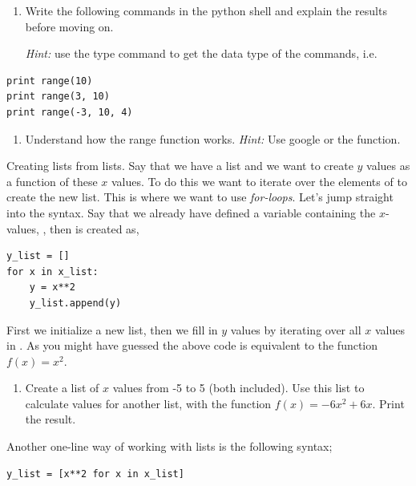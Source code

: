 \documentclass{article}
\begin{document}
\begin{enumerate}[resume]
  \item Write the following commands in the python shell and explain the results
    before moving on.

    {\em Hint:} use the type command to get the data type of the commands,
    i.e. 
\end{enumerate}


\begin{lstlisting}
print range(10)
print range(3, 10)
print range(-3, 10, 4)
\end{lstlisting}

\begin{enumerate}[resume]
    \item Understand how the range function works.
        {\em Hint:} Use google or the  function.
\end{enumerate}

Creating lists from lists.
Say that we have a list  and we want to create $y$ values as a function of these $x$ values.
To do this we want to iterate over the elements of  to create the new list.
This is where we want to use {\em for-loops}.
Let's jump straight into the syntax.
Say that we already have defined a variable containing the $x$-values, , then  is created as,

\begin{lstlisting}
y_list = []
for x in x_list:
    y = x**2
    y_list.append(y)
\end{lstlisting}

First we initialize a new list, then we fill in $y$ values by iterating over all $x$ values in .
As you might have guessed the above code is equivalent to the function $f(x) = x^2$.

\begin{enumerate}[resume]
    \item Create a list of $x$ values from -5 to 5 (both included).
    Use this list to calculate values for another list, with the function $f(x) = -6x^2 + 6x$.
    Print the result.\label{new y values}
\end{enumerate}

Another one-line way of working with lists is the following syntax;

\begin{lstlisting}
y_list = [x**2 for x in x_list]
\end{lstlisting}
\end{document}
